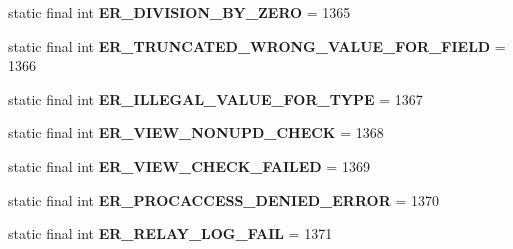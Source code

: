 \begin{DoxyCompactItemize}
\item 
\mbox{\label{classcom_1_1mysql_1_1jdbc_1_1_mysql_error_numbers_a4e2f64e902aad9c365ea712000d905f0}} 
static final int {\bfseries E\+R\+\_\+\+D\+I\+V\+I\+S\+I\+O\+N\+\_\+\+B\+Y\+\_\+\+Z\+E\+RO} = 1365
\item 
\mbox{\label{classcom_1_1mysql_1_1jdbc_1_1_mysql_error_numbers_a73f006a8c800724406b34301177d412c}} 
static final int {\bfseries E\+R\+\_\+\+T\+R\+U\+N\+C\+A\+T\+E\+D\+\_\+\+W\+R\+O\+N\+G\+\_\+\+V\+A\+L\+U\+E\+\_\+\+F\+O\+R\+\_\+\+F\+I\+E\+LD} = 1366
\item 
\mbox{\label{classcom_1_1mysql_1_1jdbc_1_1_mysql_error_numbers_aca16509957a6261dbf5626077c7be81b}} 
static final int {\bfseries E\+R\+\_\+\+I\+L\+L\+E\+G\+A\+L\+\_\+\+V\+A\+L\+U\+E\+\_\+\+F\+O\+R\+\_\+\+T\+Y\+PE} = 1367
\item 
\mbox{\label{classcom_1_1mysql_1_1jdbc_1_1_mysql_error_numbers_a6c9fdcc69aac6ac57d9dd6d822d34185}} 
static final int {\bfseries E\+R\+\_\+\+V\+I\+E\+W\+\_\+\+N\+O\+N\+U\+P\+D\+\_\+\+C\+H\+E\+CK} = 1368
\item 
\mbox{\label{classcom_1_1mysql_1_1jdbc_1_1_mysql_error_numbers_abe5ec5460f903baf1a05f0e9183a9ab8}} 
static final int {\bfseries E\+R\+\_\+\+V\+I\+E\+W\+\_\+\+C\+H\+E\+C\+K\+\_\+\+F\+A\+I\+L\+ED} = 1369
\item 
\mbox{\label{classcom_1_1mysql_1_1jdbc_1_1_mysql_error_numbers_a65d21e7fa819b265a30987fad66c5533}} 
static final int {\bfseries E\+R\+\_\+\+P\+R\+O\+C\+A\+C\+C\+E\+S\+S\+\_\+\+D\+E\+N\+I\+E\+D\+\_\+\+E\+R\+R\+OR} = 1370
\item 
\mbox{\label{classcom_1_1mysql_1_1jdbc_1_1_mysql_error_numbers_a0ce9b400aee717c01597c6125bbd9fc2}} 
static final int {\bfseries E\+R\+\_\+\+R\+E\+L\+A\+Y\+\_\+\+L\+O\+G\+\_\+\+F\+A\+IL} = 1371
\item 
\mbox{\label{classcom_1_1mysql_1_1jdbc_1_1_mysql_error_numbers_a76e60489d070cbb58a0944c58d873aac}} 

\end{DoxyCompactItemize}
